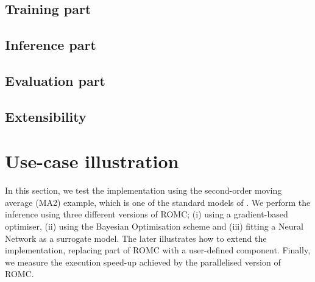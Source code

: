 \documentclass[article]{jss}
\begin{document}
\subsection{Training part} 
\label{subsec:training}


\subsection{Inference part} 
\label{subsec:inference}


\subsection{Evaluation part} 
\label{subsec:evaluation}


\subsection{Extensibility} %
\label{subsec:extensibility}


\section{Use-case illustration}

In this section, we test the implementation using the second-order
moving average (MA2) example, which is one of the standard models of
. We perform the inference using three different versions of
ROMC; (i) using a gradient-based optimiser, (ii) using the Bayesian
Optimisation scheme and (iii) fitting a Neural Network as a surrogate
model. The later illustrates how to extend the implementation,
replacing part of ROMC with a user-defined component. Finally, we
measure the execution speed-up achieved by the parallelised version of
ROMC.



% 
\end{document}
